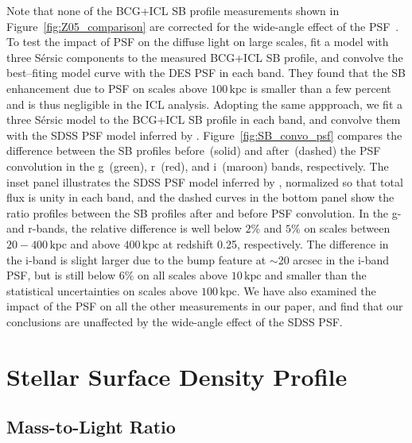 \documentclass[fleqn,usenatbib]{mnras}
\newcommand{\kpc}{\mathrm{kpc}}
\begin{document}
Note that none of the BCG+ICL SB profile measurements shown in
Figure~\ref{fig:Z05_comparison} are corrected for the wide-angle effect of
the PSF~\citep{Tal2011, D'Souza2014, Wang2019}. To test the impact of PSF
on the diffuse light on large scales, \citet{Zhang2019} fit a model with
three S\'ersic components to the measured BCG+ICL SB profile, and convolve
the best--fiting model curve with the DES PSF in each band. They found that
the SB enhancement due to PSF on scales above $100\,\kpc$ is smaller than a
few percent and is thus negligible in the ICL analysis. Adopting the same
appproach, we fit a three S\'ersic model to the BCG+ICL SB profile in each
band, and convolve them with the SDSS PSF model inferred by
\citet{Infante-Sainz2020}. Figure~\ref{fig:SB_convo_psf} compares the
difference between the SB profiles before~(solid) and after~(dashed) the
PSF convolution in the g~(green), r~(red), and i~(maroon) bands,
respectively. The inset panel illustrates the SDSS PSF model inferred by
\citet{Infante-Sainz2020}, normalized so that total flux is unity in each
band, and the dashed curves in the bottom panel show the ratio profiles
between the SB profiles after and before PSF convolution. In the g- and
r-bands, the
relative difference is well below $2\%$ and $5\%$ on scales between
$20-400\,\kpc$ and above $400\,\kpc$ at redshift 0.25, respectively. The
difference in the i-band is slight larger due to the bump feature at
$\sim$20 arcsec in the i-band PSF, but is still below $6\%$ on all scales
above $10\,\kpc$ and smaller than the statistical uncertainties on scales
above $100\,\kpc$.  We have also examined the impact of the PSF on all the
other measurements in our paper, and find that our conclusions are
unaffected by the wide-angle effect of the SDSS PSF.




\section{Stellar Surface Density Profile}
\label{sec:sigma}

\subsection{Mass-to-Light Ratio}
\label{subsec:moverl}
\end{document}
